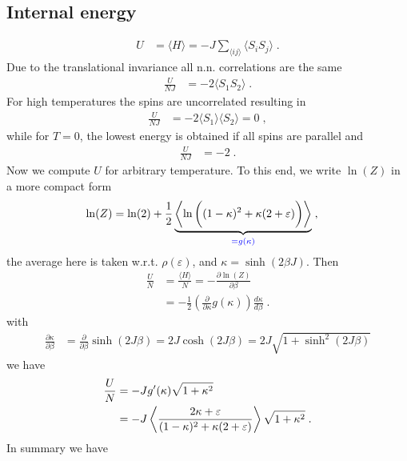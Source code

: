 \subsection{Internal energy}
%
\begin{align*}
U &= \langle H \rangle = -J\sum_{\langle ij \rangle} \langle S_{i}S_{j}\rangle\;.
\end{align*}
%
Due to the translational invariance all n.n. correlations are
the same
\begin{align*}
\frac{U}{NJ} &=-2 \langle S_{1}S_{2}\rangle\;.
\end{align*}
For high temperatures the spins are uncorrelated resulting in
\begin{align*}
\frac{U}{NJ} &=-2 \langle S_{1}\rangle \langle  S_{2}\rangle = 0\;,
\end{align*}
while for $T=0$, the lowest energy is obtained if all spins are parallel 
and
\begin{align*}
\frac{U}{NJ} &=-2\;.
\end{align*}
Now we compute $U$ for arbitrary temperature.
%
To this end, we write $\ln(Z)$ in a more compact form
%
\begin{align*}
\ln(Z) &= \ln(2) +\frac{1}{2} 
\underbrace{
\left\langle\ln \bigg((1-\kappa)^{2} + \kappa (2+\varepsilon) \bigg)\right\rangle
}_{\color{blue} = g(\kappa)}\;,
\end{align*}
%
the average here is taken w.r.t. $\rho(\varepsilon)$, and $\kappa=\sinh(2 \beta J)$. Then
\begin{align*}
\frac{U}{N} &= \frac{\langle H \rangle}{N} = -\frac{\partial \ln(Z)}{\partial \beta}\\
&=-\frac{1}{2} \left(\frac{\partial }{\partial \kappa} g(\kappa) \right)
\frac{d \kappa}{d\beta}\;.
\end{align*}
%
with
%
\begin{align*}
\frac{\partial \kappa}{\partial \beta}&= \frac{\partial }{\partial \beta} \sinh(2 J \beta) = 2 J \cosh(2 J \beta)= 2J \sqrt{ 1+\sinh^{2}(2 J\beta) }
\end{align*}
%
we have 
%
\begin{align*}
\frac{U}{N}&=-J g'(\kappa) 
\sqrt{1+\kappa^{2}} \\
&=-J \left\langle
\frac{2\kappa +\varepsilon}{(1-\kappa)^{2}+\kappa(2+\varepsilon)}
\right\rangle
\sqrt{1+\kappa^{2}} \;.
\end{align*}
%
In summary we have
%
%

